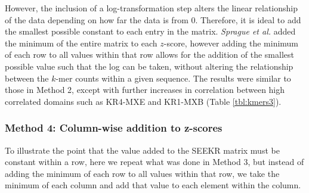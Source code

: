 However, the inclusion of a log-transformation step alters the linear relationship of the data depending on how far the data is from 0. Therefore, it is ideal to add the smallest possible constant to each entry in the matrix. \emph{Sprague et al.} added the minimum of the entire matrix to each $z$-score, however adding the minimum of each row to all values within that row allows for the addition of the smallest possible value such that the log can be taken, without altering the relationship between the $k$-mer counts within a given sequence. The results were similar to those in Method 2, except with further increases in correlation between high correlated domains such as KR4-MXE and KR1-MXB (Table \ref{tbl:kmers3}). 


\subsubsection{Method 4: Column-wise addition to z-scores}

To illustrate the point that the value added to the SEEKR matrix must be constant within a row, here we repeat what was done in Method 3, but instead of adding the minimum of each row to all values within that row, we take the minimum of each column and add that value to each element within the column.

